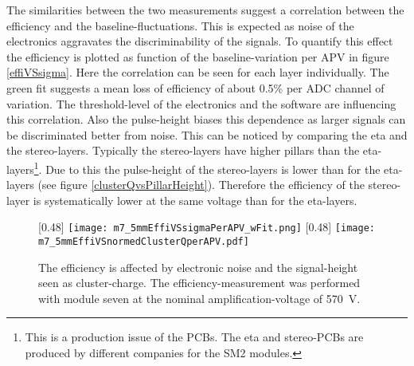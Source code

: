 \documentclass[
twoside,            %
BCOR1.4cm,          %
10pt,               %
headings=normal,    %
headsepline,        %
clearplainpage,		%
final,              %
div=14,
open=right,
bibliography=toc
]{scrreprt}
\begin{document}
The similarities between the two measurements suggest a correlation between the efficiency and the baseline-fluctuations.
This is expected as noise of the electronics aggravates the discriminability of the signals.
To quantify this effect the efficiency is plotted as function of the baseline-variation per APV in figure \ref{effiVSsigma}.
Here the correlation can be seen for each layer individually.
The green fit suggests a mean loss of efficiency of about 0.5\% per ADC channel of variation.
The threshold-level of the electronics and the software are influencing this correlation.
Also the pulse-height biases this dependence as larger signals can be discriminated better from noise.
This can be noticed by comparing the eta and the stereo-layers.
Typically the stereo-layers have higher pillars than the eta-layers\footnote{
	This is a production issue of the PCBs.
	The eta and stereo-PCBs are produced by different companies for the SM2 modules.
}.
Due to this the pulse-height of the stereo-layers is lower than for the eta-layers (see figure \ref{clusterQvsPillarHeight}).
Therefore the efficiency of the stereo-layer is systematically lower at the same voltage than for the eta-layers.

\begin{figure}[!h]
	\centering
	[0.48\textwidth]
	{\texttt{[image: m7\_5mmEffiVSsigmaPerAPV\_wFit.png]}}
	\hfill
	[0.48\textwidth]
	{\texttt{[image: m7\_5mmEffiVSnormedClusterQperAPV.pdf]}}
	\caption{
		The efficiency is affected by electronic noise and the signal-height seen as cluster-charge.
		The efficiency-measurement was performed with module seven at the nominal amplification-voltage of \SI{570}{V}.
	}
	\label{efficiencyNoiseDependence} 
	\vspace{-4mm}
\end{figure}
\end{document}
